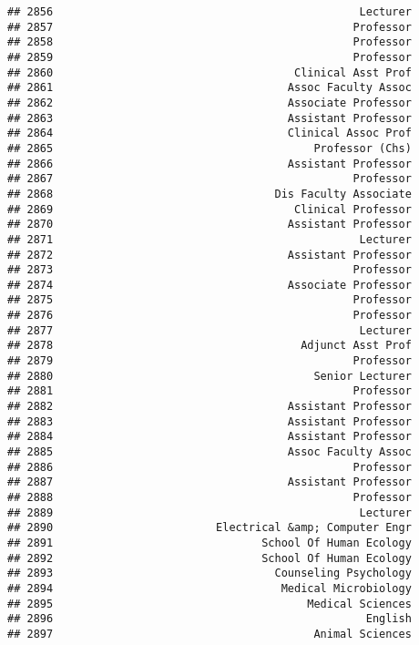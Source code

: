 \documentclass[
]{article}
\begin{document}
\begin{verbatim}
## 2856                                               Lecturer
## 2857                                              Professor
## 2858                                              Professor
## 2859                                              Professor
## 2860                                     Clinical Asst Prof
## 2861                                    Assoc Faculty Assoc
## 2862                                    Associate Professor
## 2863                                    Assistant Professor
## 2864                                    Clinical Assoc Prof
## 2865                                        Professor (Chs)
## 2866                                    Assistant Professor
## 2867                                              Professor
## 2868                                  Dis Faculty Associate
## 2869                                     Clinical Professor
## 2870                                    Assistant Professor
## 2871                                               Lecturer
## 2872                                    Assistant Professor
## 2873                                              Professor
## 2874                                    Associate Professor
## 2875                                              Professor
## 2876                                              Professor
## 2877                                               Lecturer
## 2878                                      Adjunct Asst Prof
## 2879                                              Professor
## 2880                                        Senior Lecturer
## 2881                                              Professor
## 2882                                    Assistant Professor
## 2883                                    Assistant Professor
## 2884                                    Assistant Professor
## 2885                                    Assoc Faculty Assoc
## 2886                                              Professor
## 2887                                    Assistant Professor
## 2888                                              Professor
## 2889                                               Lecturer
## 2890                         Electrical &amp; Computer Engr
## 2891                                School Of Human Ecology
## 2892                                School Of Human Ecology
## 2893                                  Counseling Psychology
## 2894                                   Medical Microbiology
## 2895                                       Medical Sciences
## 2896                                                English
## 2897                                        Animal Sciences

\end{verbatim}
\end{document}
